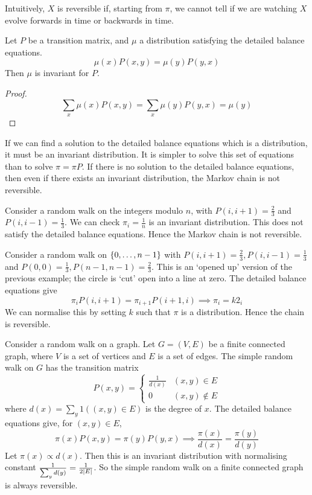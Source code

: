 \begin{remark}
	Intuitively, \( X \) is reversible if, starting from \( \pi \), we cannot tell if we are watching \( X \) evolve forwards in time or backwards in time.
\end{remark}
\begin{lemma}
	Let \( P \) be a transition matrix, and \( \mu \) a distribution satisfying the detailed balance equations.
	\[
		\mu(x) P(x,y) = \mu(y) P(y,x)
	\]
	Then \( \mu \) is invariant for \( P \).
\end{lemma}
\begin{proof}
	\[
		\sum_x \mu(x) P(x,y) = \sum_x \mu(y) P(y,x) = \mu(y)
	\]
\end{proof}
\begin{remark}
	If we can find a solution to the detailed balance equations which is a distribution, it must be an invariant distribution.
	It is simpler to solve this set of equations than to solve \( \pi = \pi P \).
	If there is no solution to the detailed balance equations, then even if there exists an invariant distribution, the Markov chain is not reversible.
\end{remark}
\begin{example}
	Consider a random walk on the integers modulo \( n \), with \( P(i, i+1) = \frac{2}{3} \) and \( P(i, i-1) = \frac{1}{3} \).
	We can check \( \pi_i = \frac{1}{n} \) is an invariant distribution.
	This does not satisfy the detailed balance equations.
	Hence the Markov chain is not reversible.
\end{example}
\begin{example}
	Consider a random walk on \( \qty{0, \dots, n-1} \) with \( P(i, i+1) = \frac{2}{3}, P(i, i-1) = \frac{1}{3} \) and \( P(0,0) = \frac{1}{3}, P(n-1, n-1) = \frac{2}{3} \).
	This is an `opened up' version of the previous example; the circle is `cut' open into a line at zero.
	The detailed balance equations give
	\[
		\pi_i P(i, i+1) = \pi_{i+1} P(i+1, i) \implies \pi_i = k 2_i
	\]
	We can normalise this by setting \( k \) such that \( \pi \) is a distribution.
	Hence the chain is reversible.
\end{example}
\begin{example}
	Consider a random walk on a graph.
	Let \( G = (V, E) \) be a finite connected graph, where \( V \) is a set of vertices and \( E \) is a set of edges.
	The simple random walk on \( G \) has the transition matrix
	\[
		P(x,y) = \begin{cases}
			\frac{1}{d(x)} & (x,y) \in E     \\
			0              & (x,y) \not\in E
		\end{cases}
	\]
	where \( d(x) = \sum_y 1((x,y) \in E) \) is the degree of \( x \).
	The detailed balance equations give, for \( (x,y) \in E \),
	\[
		\pi(x) P(x,y) = \pi(y) P(y,x) \implies \frac{\pi(x)}{d(x)} = \frac{\pi(y)}{d(y)}
	\]
	Let \( \pi(x) \propto d(x) \).
	Then this is an invariant distribution with normalising constant \( \frac{1}{\sum_y d(y)} = \frac{1}{2\abs{E}} \).
	So the simple random walk on a finite connected graph is always reversible.
\end{example}
